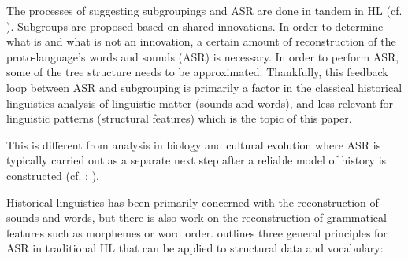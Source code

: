 \documentclass[12pt,letterpaper]{article}
\begin{document}
The processes of suggesting subgroupings and ASR are done in tandem in HL (cf. \citealt[7]{protooceanicvol1}). Subgroups are proposed based on shared innovations. In order to determine what is and what is not an innovation, a certain amount of reconstruction of the proto-language's words and sounds (ASR) is necessary. In order to perform ASR, some of the tree structure needs to be approximated. Thankfully, this feedback loop between ASR and subgrouping is primarily a factor in the classical historical linguistics analysis of linguistic matter (sounds and words), and less relevant for linguistic patterns (structural features) which is the topic of this paper.

This is different from analysis in biology and cultural evolution where ASR is typically carried out as a separate next step after a reliable model of history is constructed (cf. \citealt{holland2020accuracy}; \citealt{evans2021uses}). 






Historical linguistics has been primarily concerned with the reconstruction of sounds and words, but there is also work on the reconstruction of grammatical features such as morphemes or word order. \citet[17--22]{clark1973aspects} outlines three general principles for ASR in traditional HL that can be applied to structural data and vocabulary:
\end{document}
